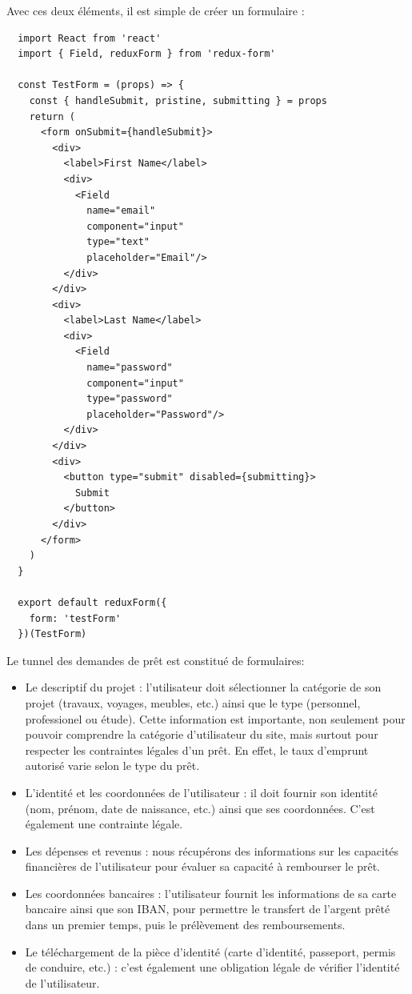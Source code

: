 \documentclass[12pt,a4paper]{article}
\providecommand{\tightlist}{%
  \setlength{\itemsep}{0pt}\setlength{\parskip}{0pt}}
\begin{document}
  Avec ces deux éléments, il est simple de créer un formulaire :

  \begin{verbatim}
  import React from 'react'
  import { Field, reduxForm } from 'redux-form'

  const TestForm = (props) => {
    const { handleSubmit, pristine, submitting } = props
    return (
      <form onSubmit={handleSubmit}>
        <div>
          <label>First Name</label>
          <div>
            <Field
              name="email"
              component="input"
              type="text"
              placeholder="Email"/>
          </div>
        </div>
        <div>
          <label>Last Name</label>
          <div>
            <Field
              name="password"
              component="input"
              type="password"
              placeholder="Password"/>
          </div>
        </div>
        <div>
          <button type="submit" disabled={submitting}>
            Submit
          </button>
        </div>
      </form>
    )
  }

  export default reduxForm({
    form: 'testForm'
  })(TestForm)
  \end{verbatim}

  \bigskip

  Le tunnel des demandes de prêt est constitué de formulaires:

  \begin{itemize}
  \tightlist
  \item
    Le descriptif du projet : l'utilisateur doit sélectionner la catégorie
    de son projet (travaux, voyages, meubles, etc.) ainsi que le type
    (personnel, professionel ou étude). Cette information est importante,
    non seulement pour pouvoir comprendre la catégorie d'utilisateur du
    site, mais surtout pour respecter les contraintes légales d'un prêt.
    En effet, le taux d'emprunt autorisé varie selon le type du prêt.
  \item
    L'identité et les coordonnées de l'utilisateur : il doit fournir son
    identité (nom, prénom, date de naissance, etc.) ainsi que ses
    coordonnées. C'est également une contrainte légale.
  \item
    Les dépenses et revenus : nous récupérons des informations sur les
    capacités financières de l'utilisateur pour évaluer sa capacité à
    rembourser le prêt.
  \item
    Les coordonnées bancaires : l'utilisateur fournit les informations de
    sa carte bancaire ainsi que son IBAN, pour permettre le transfert de
    l'argent prêté dans un premier temps, puis le prélèvement des
    remboursements.
  \item
    Le téléchargement de la pièce d'identité (carte d'identité, passeport,
    permis de conduire, etc.) : c'est également une obligation légale de
    vérifier l'identité de l'utilisateur.
  \end{itemize}
\end{document}

